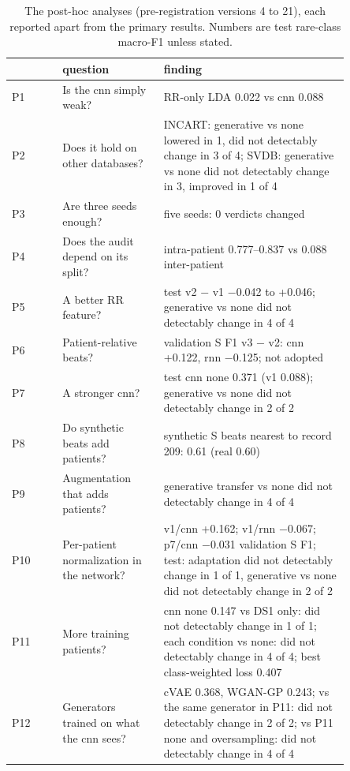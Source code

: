 \begin{table}[htbp]\centering\small
\caption{The post-hoc analyses (pre-registration versions 4 to 21), each reported apart from the primary results. Numbers are test rare-class macro-F1 unless stated.}\label{tab:posthoc}
\begin{tabular}{@{}lp{0.3\linewidth}p{0.55\linewidth}@{}}
\toprule
 & question & finding \\
\midrule
P1 & Is the cnn simply weak? & RR-only LDA 0.022 vs cnn 0.088 \\
P2 & Does it hold on other databases? & INCART: generative vs none lowered in 1, did not detectably change in 3 of 4; SVDB: generative vs none did not detectably change in 3, improved in 1 of 4 \\
P3 & Are three seeds enough? & five seeds: 0 verdicts changed \\
P4 & Does the audit depend on its split? & intra-patient 0.777--0.837 vs 0.088 inter-patient \\
P5 & A better RR feature? & test v2 $-$ v1 $-$0.042 to +0.046; generative vs none did not detectably change in 4 of 4 \\
P6 & Patient-relative beats? & validation S F1 v3 $-$ v2: cnn +0.122, rnn $-$0.125; not adopted \\
P7 & A stronger cnn? & test cnn none 0.371 (v1 0.088); generative vs none did not detectably change in 2 of 2 \\
P8 & Do synthetic beats add patients? & synthetic S beats nearest to record 209: 0.61 (real 0.60) \\
P9 & Augmentation that adds patients? & generative transfer vs none did not detectably change in 4 of 4 \\
P10 & Per-patient normalization in the network? & v1/cnn +0.162; v1/rnn $-$0.067; p7/cnn $-$0.031 validation S F1; test: adaptation did not detectably change in 1 of 1, generative vs none did not detectably change in 2 of 2 \\
P11 & More training patients? & cnn none 0.147 vs DS1 only: did not detectably change in 1 of 1; each condition vs none: did not detectably change in 4 of 4; best class-weighted loss 0.407 \\
P12 & Generators trained on what the cnn sees? & cVAE 0.368, WGAN-GP 0.243; vs the same generator in P11: did not detectably change in 2 of 2; vs P11 none and oversampling: did not detectably change in 4 of 4 \\
\bottomrule
\end{tabular}
\end{table}
